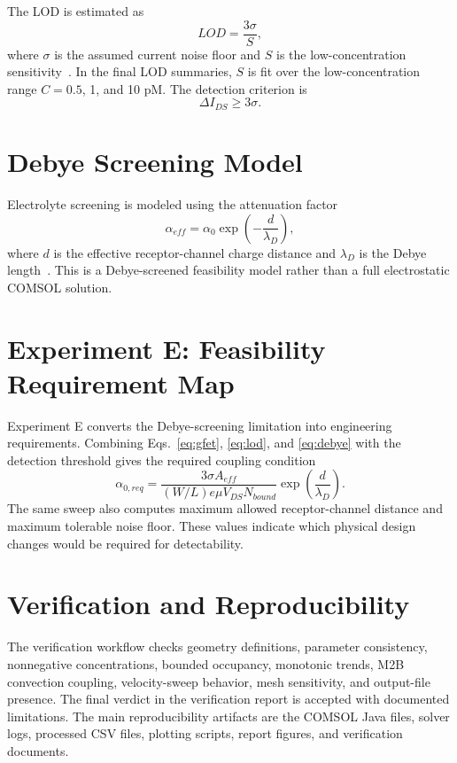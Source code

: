 ﻿\documentclass[12pt,a4paper,oneside]{report}
\begin{document}
The LOD is estimated as
\begin{equation}
LOD=\frac{3\sigma}{S},
\label{eq:lod}
\end{equation}
where $\sigma$ is the assumed current noise floor and $S$ is the low-concentration sensitivity~\cite{Shrivastava2011}. In the final LOD summaries, $S$ is fit over the low-concentration range $C=0.5$, 1, and 10 pM. The detection criterion is
\begin{equation}
\Delta I_{DS}\geq3\sigma.
\label{eq:detectcriterion}
\end{equation}

\section{Debye Screening Model}
Electrolyte screening is modeled using the attenuation factor
\begin{equation}
\alpha_{eff}=\alpha_0\exp\left(-\frac{d}{\lambda_D}\right),
\label{eq:debye}
\end{equation}
where $d$ is the effective receptor-channel charge distance and $\lambda_D$ is the Debye length~\cite{Stern2010Debye}. This is a Debye-screened feasibility model rather than a full electrostatic COMSOL solution.

\section{Experiment E: Feasibility Requirement Map}
Experiment E converts the Debye-screening limitation into engineering requirements. Combining Eqs.~\ref{eq:gfet}, \ref{eq:lod}, and \ref{eq:debye} with the detection threshold gives the required coupling condition
\begin{equation}
\alpha_{0,req}=\frac{3\sigma A_{eff}}{(W/L)e\mu V_{DS}N_{bound}}
\exp\left(\frac{d}{\lambda_D}\right).
\label{eq:alphareq}
\end{equation}
The same sweep also computes maximum allowed receptor-channel distance and maximum tolerable noise floor. These values indicate which physical design changes would be required for detectability.

\section{Verification and Reproducibility}
The verification workflow checks geometry definitions, parameter consistency, nonnegative concentrations, bounded occupancy, monotonic trends, M2B convection coupling, velocity-sweep behavior, mesh sensitivity, and output-file presence. The final verdict in the verification report is accepted with documented limitations. The main reproducibility artifacts are the COMSOL Java files, solver logs, processed CSV files, plotting scripts, report figures, and verification documents.
\end{document}
